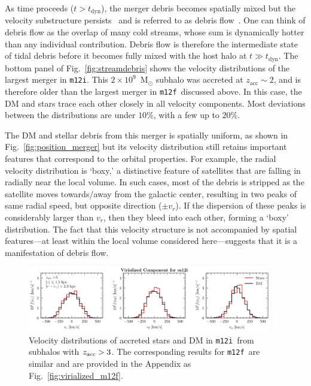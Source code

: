 \documentclass[twocolumn,preprintnumbers]{aastex6}
\DeclareRobustCommand{\Fig}[1]{Fig.~\ref{#1}}
\newcommand{\zacc}{z_\mathrm{acc}}
\newcommand{\mi}{\texttt{m12i}}
\newcommand{\mf}{\texttt{m12f}}
\begin{document}
As time proceeds ($t > t_\mathrm{dyn}$), the merger debris becomes spatially mixed but the velocity substructure persists~\citep{Helmi:1999ks} and is referred to as debris flow~\citep{Lisanti:2011as, Kuhlen:2012fz, Lisanti:2014dva}.  One can think of debris flow as the overlap of many cold streams, whose sum is dynamically hotter than any individual contribution.  Debris flow is therefore the intermediate state of tidal debris before it becomes fully mixed with the host halo at $t\gg t_\mathrm{dyn}$.  
The bottom panel of \Fig{fig:streamdebris} shows the velocity distributions of the largest merger in \mi. This $2\times10^9$~M$_\odot$ subhalo was accreted at $\zacc \sim2$, and is therefore older than the largest merger in \mf~discussed above.  In this case, the DM and stars trace each other closely in all velocity components. Most deviations between the distributions are under $10\%$, with a few up to $20\%.$

The DM and stellar debris from this merger is spatially uniform, as shown in \Fig{fig:position_merger} but its velocity distribution still retains important features that correspond to the orbital properties.  For example, the radial velocity distribution is `boxy,' a distinctive feature of satellites that are falling in radially near the local volume.  In such cases, most of the debris is stripped as the satellite moves towards/away from the galactic center, resulting in two peaks of same radial speed, but opposite direction ($\pm v_r$).  If the dispersion of these peaks is considerably larger than $v_r$, then they bleed into each other, forming a `boxy' distribution.  The fact that this velocity structure is not accompanied by spatial features---at least within the local volume considered here---suggests that it is a manifestation of debris flow.  

\begin{figure}[tb] %
   \centering
	\includegraphics[width=0.95\textwidth]{plots/virialized_component_vr_vtheta_vphi3m12i.pdf} 
   \caption{Velocity distributions of accreted stars and DM in \mi~from subhalos with $z_{\rm{acc}} > 3$.  The corresponding results for \mf~are similar and are provided in the Appendix as \Fig{fig:virialized_m12f}.}
   \label{fig:virialized}
\end{figure}
\end{document}
